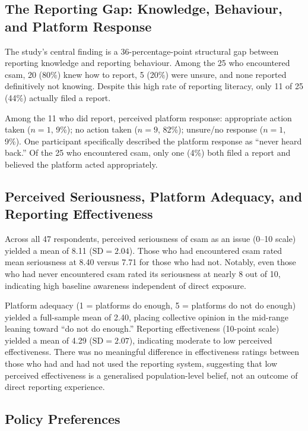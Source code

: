 \documentclass{ieee-portfolio}
\begin{document}
\subsection{The Reporting Gap: Knowledge, Behaviour, and Platform Response}
 
The study's central finding is a 36-percentage-point structural gap between reporting knowledge and reporting behaviour. Among the 25 who encountered \gls{csam}, 20 (80\%) knew how to report, 5 (20\%) were unsure, and none reported definitively not knowing. Despite this high rate of reporting literacy, only 11 of 25 (44\%) actually filed a report.
 
Among the 11 who did report, perceived platform response: appropriate action taken ($n = 1$, 9\%); no action taken ($n = 9$, 82\%); unsure/no response ($n = 1$, 9\%). One participant specifically described the platform response as ``never heard back.'' Of the 25 who encountered \gls{csam}, only one (4\%) both filed a report and believed the platform acted appropriately.
 
\subsection{Perceived Seriousness, Platform Adequacy, and Reporting Effectiveness}
 
Across all 47 respondents, perceived seriousness of \gls{csam} as an issue (0--10 scale) yielded a mean of 8.11 ($\text{SD} = 2.04$). Those who had encountered \gls{csam} rated mean seriousness at 8.40 versus 7.71 for those who had not. Notably, even those who had never encountered \gls{csam} rated its seriousness at nearly 8 out of 10, indicating high baseline awareness independent of direct exposure.
 
Platform adequacy (1 = platforms do enough, 5 = platforms do not do enough) yielded a full-sample mean of 2.40, placing collective opinion in the mid-range leaning toward ``do not do enough.'' Reporting effectiveness (10-point scale) yielded a mean of 4.29 ($\text{SD} = 2.07$), indicating moderate to low perceived effectiveness. There was no meaningful difference in effectiveness ratings between those who had and had not used the reporting system, suggesting that low perceived effectiveness is a generalised population-level belief, not an outcome of direct reporting experience.
 
\subsection{Policy Preferences}
 
\end{document}
